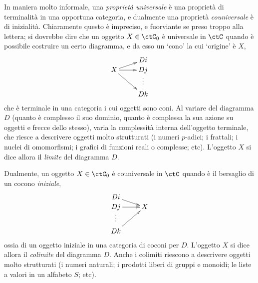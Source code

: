 In maniera molto informale, una \emph{proprietà universale} è una proprietà di terminalità in una opportuna categoria, e dualmente una proprietà \emph{couniversale} è di inizialità. Chiaramente questo è impreciso, e fuorviante se preso troppo alla lettera; si dovrebbe dire che un oggetto \(X\in\ctC_0\) è universale in \(\ctC\) quando è possibile costruire un certo diagramma, e da esso un `cono' la cui `origine' è \(X\),
\[\xymatrix@R=0mm{
	& Di \\
	X \ar@{->}[ru] \ar@{->}[r] \ar@{->}[rdd] & Dj \\
	& \vdots \\
	& Dk
	}\]
che è terminale in una categoria i cui oggetti sono coni. Al variare del diagramma \(D\) (quanto è complesso il suo dominio, quanto è complessa la sua azione su oggetti e frecce dello stesso), varia la complessità interna dell'oggetto terminale, che riesce a descrivere oggetti molto strutturati (i numeri \(p\)-adici; i frattali; i nuclei di omomorfismi; i grafici di funzioni reali o complesse; etc). L'oggetto \(X\) si dice allora il \emph{limite} del diagramma \(D\).

Dualmente, un oggetto \(X\in\ctC_0\) è couniversale in \(\ctC\) quando è il bersaglio di un cocono \emph{iniziale},
\[\xymatrix@R=0mm{
	Di \ar@{->}[rd] &  \\
	Dj \ar@{->}[r] & X \\
	\vdots &  \\
	Dk \ar@{->}[ruu] &
	}\]
ossia di un oggetto iniziale in una categoria di coconi per \(D\). L'oggetto \(X\) si dice allora il \emph{colimite} del diagramma \(D\). Anche i colimiti riescono a descrivere oggetti molto strutturati (i numeri naturali; i prodotti liberi di gruppi e monoidi; le liste a valori in un alfabeto \(S\); etc).

